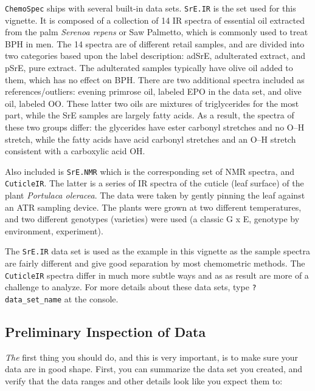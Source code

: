 \documentclass[letter,10pt,twocolumn,twoside,printwatermark=false]{pinp}
\begin{document}
\texttt{ChemoSpec} ships with several built-in data sets.
\texttt{SrE.IR} is the set used for this vignette. It is composed of a
collection of 14 IR spectra of essential oil extracted from the palm
\emph{Serenoa repens} or Saw Palmetto, which is commonly used to treat
BPH in men. The 14 spectra are of different retail samples, and are
divided into two categories based upon the label description: adSrE,
adulterated extract, and pSrE, pure extract. The adulterated samples
typically have olive oil added to them, which has no effect on BPH.
There are two additional spectra included as references/outliers:
evening primrose oil, labeled EPO in the data set, and olive oil,
labeled OO. These latter two oils are mixtures of triglycerides for the
most part, while the SrE samples are largely fatty acids. As a result,
the spectra of these two groups differ: the glycerides have ester
carbonyl stretches and no O--H stretch, while the fatty acids have acid
carbonyl stretches and an O--H stretch consistent with a carboxylic acid
OH.

Also included is \texttt{SrE.NMR} which is the corresponding set of NMR
spectra, and \texttt{CuticleIR}. The latter is a series of IR spectra of
the cuticle (leaf surface) of the plant \emph{Portulaca oleracea}. The
data were taken by gently pinning the leaf against an ATR sampling
device. The plants were grown at two different temperatures, and two
different genotypes (varieties) were used (a classic G x E, genotype by
environment, experiment).

The \texttt{SrE.IR} data set is used as the example in this vignette as
the sample spectra are fairly different and give good separation by most
chemometric methods. The \texttt{CuticleIR} spectra differ in much more
subtle ways and as as result are more of a challenge to analyze. For
more details about these data sets, type \texttt{?data\_set\_name} at
the console.

\hypertarget{preliminary-inspection-of-data}{%
\subsection{Preliminary Inspection of
Data}\label{preliminary-inspection-of-data}}

\label{sec-prelim} \emph{The} first thing you should do, and this is
very important, is to make sure your data are in good shape. First, you
can summarize the data set you created, and verify that the data ranges
and other details look like you expect them to:
\end{document}
